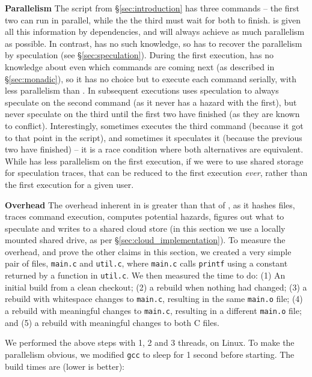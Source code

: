 \textbf{Parallelism} The script from \S\ref{sec:introduction} has three commands -- the first two can run in parallel, while the the third must wait for both to finish. \Make is given all this information by dependencies, and will always achieve as much parallelism as possible. In contrast, \Rattle has no such knowledge, so has to recover the parallelism by speculation (see \S\ref{sec:speculation}). During the first execution, \Rattle has no knowledge about even which commands are coming next (as described in \S\ref{sec:monadic}), so it has no choice but to execute each command serially, with less parallelism than \Make. In subsequent executions \Rattle uses speculation to always speculate on the second command (as it never has a hazard with the first), but never speculate on the third until the first two have finished (as they are known to conflict). Interestingly, sometimes \Rattle executes the third command (because it got to that point in the script), and sometimes it speculates it (because the previous two have finished) -- it is a race condition where both alternatives are equivalent. While \Rattle has less parallelism on the first execution, if we were to use shared storage for speculation traces, that can be reduced to the first execution \emph{ever}, rather than the first execution for a given user.

\textbf{Overhead} The overhead inherent in \Rattle is greater than that of \Make, as it hashes files, traces command execution, computes potential hazards, figures out what to speculate and writes to a shared cloud store (in this section we use a locally mounted shared drive, as per \S\ref{sec:cloud_implementation}). To measure the overhead, and prove the other claims in this section, we created a very simple pair of files, \texttt{main.c} and \texttt{util.c}, where \texttt{main.c} calls \texttt{printf} using a constant returned by a function in \texttt{util.c}. We then measured the time to do: (1) An initial build from a clean checkout;
(2) a rebuild when nothing had changed;
(3) a rebuild with whitespace changes to \texttt{main.c}, resulting in the same \texttt{main.o} file;
(4) a rebuild with meaningful changes to \texttt{main.c}, resulting in a different \texttt{main.o} file; and
(5) a rebuild with meaningful changes to both C files.

We performed the above steps with 1, 2 and 3 threads, on Linux. To make the parallelism obvious, we modified \texttt{gcc} to sleep for 1 second before starting. The build times are (lower is better):

